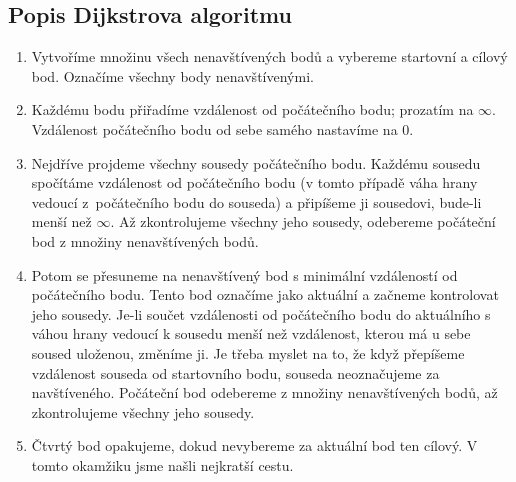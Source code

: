 \subsection{Popis Dijkstrova algoritmu}
\label{subsec:popis-algoritmu}

\begin{enumerate}
    \item Vytvoříme množinu všech nenavštívených bodů a vybereme startovní a cílový bod. Označíme všechny body nenavštívenými. 
    \item Každému bodu přiřadíme vzdálenost od počátečního bodu; prozatím na $\infty$. Vzdálenost počátečního bodu od sebe samého nastavíme na $0$. 
    \item Nejdříve projdeme všechny sousedy počátečního bodu. Každému sousedu spočítáme vzdálenost od počátečního bodu (v tomto případě váha hrany vedoucí z~počátečního bodu do souseda) a připíšeme ji sousedovi, bude-li menší než $\infty$. Až zkontrolujeme všechny jeho sousedy, odebereme počáteční bod z množiny nenavštívených bodů.
    \item Potom se přesuneme na nenavštívený bod s minimální vzdáleností od počátečního bodu. 
    Tento bod označíme jako aktuální a začneme kontrolovat jeho sousedy. 
    Je-li součet vzdálenosti od počátečního bodu do aktuálního s váhou hrany vedoucí k sousedu menší než vzdálenost, kterou má u sebe soused uloženou, změníme ji.
    Je třeba myslet na to, že když přepíšeme vzdálenost souseda od startovního bodu, souseda neoznačujeme za navštíveného. Počáteční bod odebereme z množiny nenavštívených bodů, až zkontrolujeme všechny jeho sousedy.
    \item Čtvrtý bod opakujeme, dokud nevybereme za aktuální bod ten cílový. V tomto okamžiku jsme našli nejkratší cestu.
\end{enumerate}